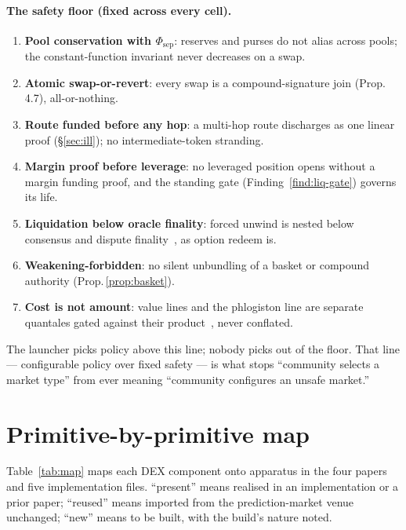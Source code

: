 \documentclass[11pt]{article}
\theoremstyle{definition}
\newcommand{\Fsep}{\ensuremath{\Phi_{\mathrm{sep}}}}
\begin{document}
\paragraph{The safety floor (fixed across every cell).}
\begin{enumerate}[label=\arabic*.,leftmargin=2em]
\item \textbf{Pool conservation with $\Fsep$}: reserves and purses do not alias across pools; the
constant-function invariant never decreases on a swap.
\item \textbf{Atomic swap-or-revert}: every swap is a compound-signature join (Prop.\,4.7), all-or-nothing.
\item \textbf{Route funded before any hop}: a multi-hop route discharges as one linear proof
(\S\ref{sec:ill}); no intermediate-token stranding.
\item \textbf{Margin proof before leverage}: no leveraged position opens without a margin funding proof,
and the standing gate (Finding~\ref{find:liq-gate}) governs its life.
\item \textbf{Liquidation below oracle finality}: forced unwind is nested below consensus and dispute
finality~\cite[Inv.\,7.1]{predmkt}, as option redeem is.
\item \textbf{Weakening-forbidden}: no silent unbundling of a basket or compound authority
(Prop.\,\ref{prop:basket}).
\item \textbf{Cost is not amount}: value lines and the phlogiston line are separate quantales gated
against their product~\cite[\S6]{ppf}, never conflated.
\end{enumerate}
The launcher picks policy above this line; nobody picks out of the floor. That line --- configurable
policy over fixed safety --- is what stops ``community selects a market type'' from ever meaning
``community configures an unsafe market.''

\section{Primitive-by-primitive map}\label{sec:map}

Table~\ref{tab:map} maps each DEX component onto apparatus in the four papers and five implementation
files. ``present'' means realised in an implementation or a prior paper; ``reused'' means imported from
the prediction-market venue unchanged; ``new'' means to be built, with the build's nature noted.
\end{document}
